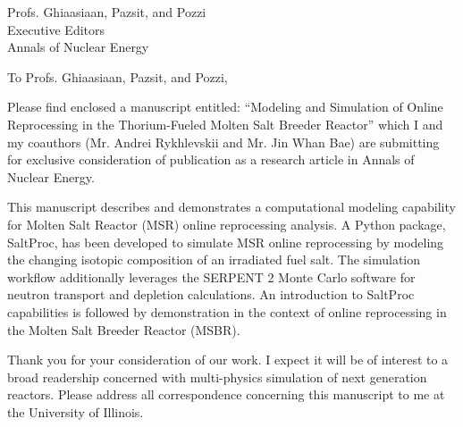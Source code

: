 \documentclass[11pt]{letter} %
\newcommand{\RecipientName}{Profs. Ghiaasiaan, Pazsit, and Pozzi\xspace}
\newcommand{\RecipientAddress}{Executive Editors\\Annals of Nuclear Energy}
\begin{document}



\begin{letter}{\RecipientName\\
        \RecipientAddress\xspace}

\address{Kathryn D. Huff\\
kdhuff@illinois.edu\\
118 Talbot Laboratory\\
104 Wright Street\\
MC-234\\
Urbana, IL 61801}


\opening{To \RecipientName,}

Please find enclosed a manuscript entitled: ``Modeling and Simulation of Online
Reprocessing in the Thorium-Fueled Molten Salt Breeder Reactor'' which I and my 
coauthors (Mr. Andrei Rykhlevskii and Mr. Jin Whan Bae) are submitting for 
exclusive consideration of publication as a research article in Annals of 
Nuclear Energy.

This manuscript describes and demonstrates a computational modeling capability
for Molten Salt Reactor (MSR) online reprocessing analysis.  A Python package,
SaltProc, has been developed to simulate MSR online reprocessing by modeling
the changing isotopic composition of an irradiated fuel salt. The simulation
workflow additionally leverages the SERPENT 2 Monte Carlo software for neutron
transport and depletion calculations. An introduction to SaltProc capabilities
is followed by demonstration in the context of online reprocessing in the
Molten Salt Breeder Reactor (MSBR).  

Thank you for your consideration of our work.  I expect it will be of interest
to a broad readership concerned with multi-physics simulation of next generation
reactors.  Please address all correspondence concerning this manuscript to me at the University of Illinois.




\end{letter}
\end{document}
